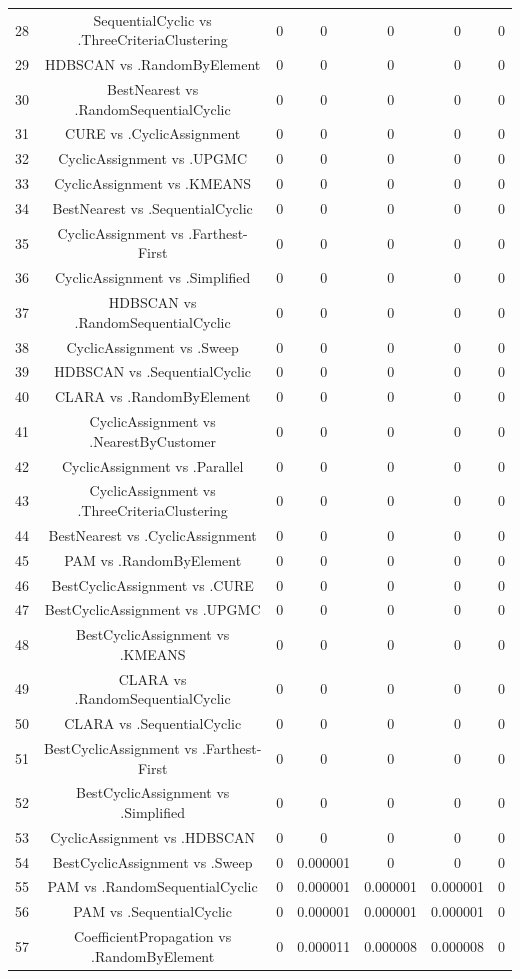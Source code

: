 \documentclass[a4paper,10pt]{article}
\begin{document}
\begin{landscape}
\begin{table}[!htp]
\begin{tabular}{ccccccc}
28&SequentialCyclic vs .ThreeCriteriaClustering&0&0&0&0&0\\
29&HDBSCAN vs .RandomByElement&0&0&0&0&0\\
30&BestNearest vs .RandomSequentialCyclic&0&0&0&0&0\\
31&CURE vs .CyclicAssignment&0&0&0&0&0\\
32&CyclicAssignment vs .UPGMC&0&0&0&0&0\\
33&CyclicAssignment vs .KMEANS&0&0&0&0&0\\
34&BestNearest vs .SequentialCyclic&0&0&0&0&0\\
35&CyclicAssignment vs .Farthest-First&0&0&0&0&0\\
36&CyclicAssignment vs .Simplified&0&0&0&0&0\\
37&HDBSCAN vs .RandomSequentialCyclic&0&0&0&0&0\\
38&CyclicAssignment vs .Sweep&0&0&0&0&0\\
39&HDBSCAN vs .SequentialCyclic&0&0&0&0&0\\
40&CLARA vs .RandomByElement&0&0&0&0&0\\
41&CyclicAssignment vs .NearestByCustomer&0&0&0&0&0\\
42&CyclicAssignment vs .Parallel&0&0&0&0&0\\
43&CyclicAssignment vs .ThreeCriteriaClustering&0&0&0&0&0\\
44&BestNearest vs .CyclicAssignment&0&0&0&0&0\\
45&PAM vs .RandomByElement&0&0&0&0&0\\
46&BestCyclicAssignment vs .CURE&0&0&0&0&0\\
47&BestCyclicAssignment vs .UPGMC&0&0&0&0&0\\
48&BestCyclicAssignment vs .KMEANS&0&0&0&0&0\\
49&CLARA vs .RandomSequentialCyclic&0&0&0&0&0\\
50&CLARA vs .SequentialCyclic&0&0&0&0&0\\
51&BestCyclicAssignment vs .Farthest-First&0&0&0&0&0\\
52&BestCyclicAssignment vs .Simplified&0&0&0&0&0\\
53&CyclicAssignment vs .HDBSCAN&0&0&0&0&0\\
54&BestCyclicAssignment vs .Sweep&0&0.000001&0&0&0\\
55&PAM vs .RandomSequentialCyclic&0&0.000001&0.000001&0.000001&0\\
56&PAM vs .SequentialCyclic&0&0.000001&0.000001&0.000001&0\\
57&CoefficientPropagation vs .RandomByElement&0&0.000011&0.000008&0.000008&0\\

\end{tabular}
\end{table}
\end{landscape}
\end{document}

